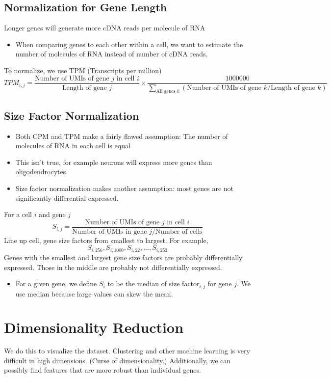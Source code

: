 \documentclass[10pt]{article}
\begin{document}
\subsection*{Normalization for Gene Length}
Longer genes will generate more cDNA reads per molecule of RNA
\begin{itemize}
	\item When comparing genes to each other within a cell, we want to estimate the number of molecules of RNA instead of number of cDNA reads.
\end{itemize}
To normalize, we use TPM (Transcripts per million)
\[TPM_{i, j} = \frac{\text{Number of UMIs of gene $j$ in cell $i$}}{\text{Length of gene $j$}} \times \frac{1000000}{\sum_{\text{All genes $k$}} (\text{Number of UMIs of gene $k$} / \text{Length of gene $k$})}\]

\subsection*{Size Factor Normalization}
\begin{itemize}
	\item Both CPM and TPM make a fairly flawed assumption: The number of molecules of RNA in each cell is equal
	\item This isn't true, for example neurons will express more genes than oligodendrocytes
	\item Size factor normalization makes another assumption: most genes are not significantly differential expressed.
\end{itemize}
For a cell $i$ and gene $j$
\[S_{i, j} = \frac{\text{Number of UMIs of gene $j$ in cell $i$}}{\text{Number of UMIs in gene $j$} / \text{Number of cells}}\]
Line up cell, gene size factors from smallest to largest.  For example,
\[S_{i, 256}, S_{i, 1000}, S_{i, 22}, \dots, S_{i, 252}\]
Genes with the smallest and largest gene size factors are probably differentially expressed.  Those in the middle are probably not differentially expressed.
\begin{itemize}
	\item For a given gene, we define $S_i$ to be the median of size factor$_{i, j}$ for gene $j$.  We use median because large values can skew the mean.
\end{itemize}

\section*{Dimensionality Reduction}
We do this to visualize the dataset.   Clustering and other machine learning is very difficult in high dimensions. (Curse of dimensionality.)  Additionally, we can possibly find features that are more robust than individual genes.
\end{document}
